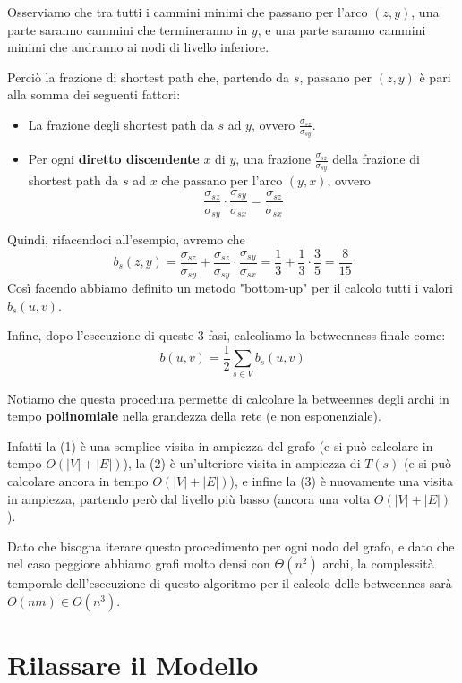 Osserviamo che tra tutti i cammini minimi che passano per l'arco $(z, y)$, una parte saranno cammini che termineranno in $y$, e una parte saranno cammini minimi che andranno ai nodi di livello inferiore.

Perciò la frazione di shortest path che, partendo da $s$, passano per $(z, y)$ è pari alla somma dei seguenti fattori:
\begin{itemize}
    \item La frazione degli shortest path da $s$ ad $y$, ovvero $\frac{\sigma_{sz}}{\sigma_{sy}}$. 
    \item Per ogni \textbf{diretto discendente} $x$ di $y$, una frazione $\frac{\sigma_{sz}}{\sigma_{sy}}$ della frazione di shortest path da $s$ ad $x$ che passano per l'arco $(y,x)$, ovvero 
    \[
    \frac{\sigma_{sz}}{\sigma_{sy}} \cdot \frac{\sigma_{sy}}{\sigma_{sx}} = \frac{\sigma_{sz}}{\sigma_{sx}}
    \]
\end{itemize}


Quindi, rifacendoci all'esempio, avremo che 
\[
b_s(z,y) = \frac{\sigma_{sz}}{\sigma_{sy}} + \frac{\sigma_{sz}}{\sigma_{sy}} \cdot \frac{\sigma_{sy}}{\sigma_{sx}} = \frac{1}{3} + \frac{1}{3}\cdot\frac{3}{5} = \frac{8}{15}
\]
Così facendo abbiamo definito un metodo "bottom-up" per il calcolo tutti i valori $b_s(u,v)$.

Infine, dopo l'esecuzione di queste 3 fasi, calcoliamo la betweenness finale come:
\[
    b(u,v) = \frac{1}{2} \sum_{s \in V} b_s(u,v)
\]

Notiamo che questa procedura permette di calcolare la betweennes degli archi in tempo \textbf{polinomiale} nella grandezza della rete (e non esponenziale).

Infatti la (1) è una semplice visita in ampiezza del grafo (e si può calcolare in tempo $O(|V| + |E|)$), la (2) è un'ulteriore visita in ampiezza di $T(s)$ (e si può calcolare ancora in tempo $O(|V| + |E|)$), e infine la (3) è nuovamente una visita in ampiezza, partendo però dal livello più basso (ancora una volta $O(|V| + |E|)$).

Dato che bisogna iterare questo procedimento per ogni nodo del grafo, e dato che nel caso peggiore abbiamo grafi molto densi con $\Theta(n^2)$ archi, la complessità temporale dell'esecuzione di questo algoritmo per il calcolo delle betweennes sarà $O(nm) \in O(n^3)$.

\section{Rilassare il Modello}

